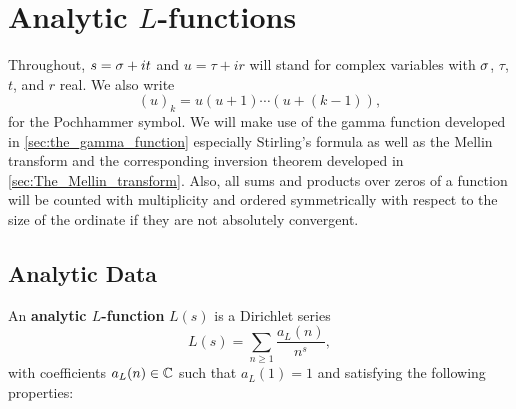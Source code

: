 \chapter{Analytic \texorpdfstring{\(L\)}{L}-functions}
  Throughout, \(s = \sigma+it\) and \(u = \tau+ir\) will stand for complex variables with \(\sigma\), \(\tau\), \(t\), and \(r\) real. We also write
  \[
    (u)_{k} = u(u+1) \cdots (u+(k-1)),
  \]
  for the Pochhammer symbol. We will make use of the gamma function developed in \cref{sec:the_gamma_function} especially Stirling's formula as well as the Mellin transform and the corresponding inversion theorem developed in \cref{sec:The_Mellin_transform}. Also, all sums and products over zeros of a function will be counted with multiplicity and ordered symmetrically with respect to the size of the ordinate if they are not absolutely convergent.
  \section{Analytic Data}
    An \textbf{analytic \(L\)-function} \(L(s)\) is a Dirichlet series
    \[
      L(s) = \sum_{n \ge 1}\frac{a_{L}(n)}{n^{s}},
    \]
    with coefficients \(a_{L}(n) \in \mathbb{C}\) such that \(a_{L}(1) = 1\) and satisfying the following properties:
